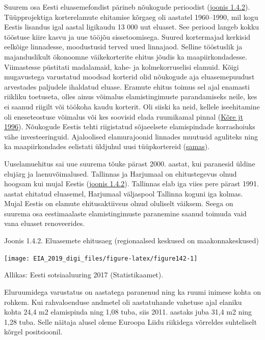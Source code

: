 \documentclass[estonian,]{article}
\begin{document}
Suurem osa Eesti eluasemefondist pärineb nõukogude perioodist (\protect\hyperlink{figure142}{joonis 1.4.2}). Tüüpprojektiga korterelamute ehitamise kõrgaeg oli aastatel 1960--1990, mil kogu Eestis lisandus igal aastal ligikaudu 13 000 uut eluaset. See periood langeb kokku tööstuse kiire kasvu ja uue tööjõu sissetoomisega. Suured kortermajad kerkisid eelkõige linnadesse, moodustusid terved uued linnajaod. Selline tööstuslik ja majanduslikult ökonoomne väikekorterite ehitus jõudis ka maapiirkondadesse. Viimastesse püstitati madalamaid, kahe- ja kolmekorruselisi elamuid. Kõigi mugavustega varustatud moodsad korterid olid nõukogude aja eluasemepuudust arvestades paljudele ihaldatud eluase. Eramute ehitus toimus sel ajal enamasti riikliku toetuseta, olles ainus võimalus elamistingimuste parandamiseks neile, kes ei saanud riigilt või töökoha kaudu korterit. Oli siiski ka neid, kellele iseehitamine oli eneseteostuse võimalus või kes soovisid elada ruumikamal pinnal (\protect\hyperlink{Kuxf5re1996}{Kõre jt 1996}). Nõukogude Eestis tehti riigistatud sõjaeelsete elamispindade korrashoiuks vähe investeeringuid. Ajaloolised elamurajoonid linnades muutusid aguliteks ning ka maapiirkondades eelistati üldjuhul uusi tüüpkortereid (\protect\hyperlink{Kuxf5re1996}{samas}).

Uuselamuehitus sai uue suurema tõuke pärast 2000. aastat, kui paranesid üldine elujärg ja laenuvõimalused. Tallinnas ja Harjumaal on ehitustegevus olnud hoogsam kui mujal Eestis (\protect\hyperlink{figure142}{joonis 1.4.2}). Tallinnas elab iga viies pere pärast 1991. aastat ehitatud eluasemel, Harjumaal väljaspool Tallinna koguni iga kolmas. Mujal Eestis on elamute ehitusaktiivsus olnud oluliselt väiksem. Seega on suurema osa eestimaalaste elamistingimuste paranemine saanud toimuda vaid vana eluaset renoveerides.

{Joonis 1.4.2.} Eluasemete ehitusaeg (regionaalsed keskused on maakonnakeskused)

\begin{center}\texttt{[image: EIA\_2019\_digi\_files/figure-latex/figure142-1]} \end{center}

\begin{imgsource}
{Allikas:} Eesti sotsiaaluuring 2017 (Statistikaamet).
\end{imgsource}

Eluruumidega varustatus on aastatega paranenud ning ka ruumi inimese kohta on rohkem. Kui rahvaloenduse andmetel oli aastatuhande vahetuse ajal elaniku kohta 24,4 m2 elamispinda ning 1,08 tuba, siis 2011. aastaks juba 31,4 m2 ning 1,28 tuba. Selle näitaja alusel oleme Euroopa Liidu riikidega võrreldes suhteliselt kõrgel positsioonil.
\end{document}
